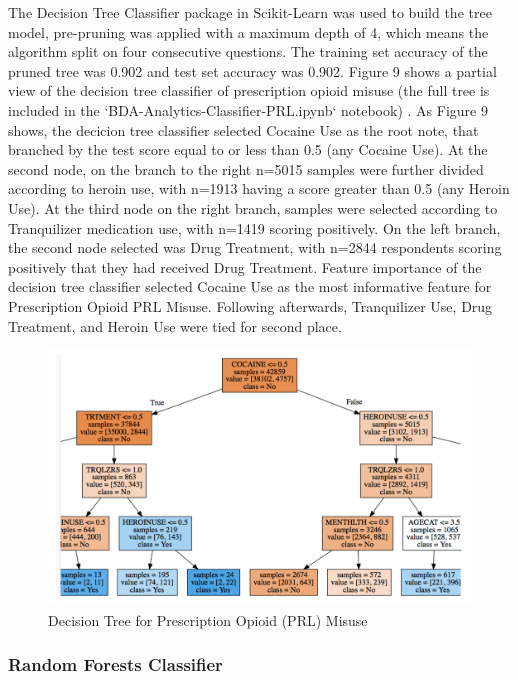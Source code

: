 \documentclass[sigconf]{acmart}
\begin{document}
The Decision Tree Classifier package in Scikit-Learn was used to build the 
tree model, pre-pruning was applied with a maximum depth of 4, which means 
the algorithm split on four consecutive questions. The training set accuracy 
of the pruned tree was 0.902 and test set accuracy was 0.902. Figure 9 shows 
a partial view of the decision tree classifier of prescription opioid misuse
(the full tree is included in the `BDA-Analytics-Classifier-PRL.ipynb` 
notebook) \cite{classifyPRL}. As Figure 9 shows, the decicion tree classifier
selected Cocaine Use as the root note, that branched by the test score equal
to or less than 0.5 (any Cocaine Use). At the second node, on the branch to 
the right n=5015 samples were further divided according to heroin use, with 
n=1913 having a score greater than 0.5 (any Heroin Use). At the third node
on the right branch, samples were selected according to Tranquilizer
medication use, with n=1419 scoring positively. On the left branch, the 
second node selected was Drug Treatment, with n=2844 respondents scoring
positively that they had received Drug Treatment. Feature importance of
the decision tree classifier selected Cocaine Use as the most informative
feature for Prescription Opioid PRL Misuse. Following afterwards, 
Tranquilizer Use, Drug Treatment, and Heroin Use were tied for second place. 

\begin{figure}[!ht]
  \centering\includegraphics[width=\columnwidth]{images/Figure9.pdf}
  \caption{Decision Tree for Prescription Opioid (PRL) Misuse}
  \label{f:Figure9}
\end{figure}

\subsubsection{Random Forests Classifier}
\end{document}
